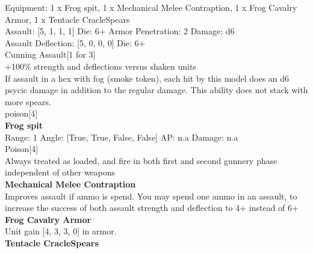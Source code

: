 Equipment: 1 x Frog spit, 1 x Mechanical Melee Contraption, 1 x Frog Cavalry Armor, 1 x Tentacle CracleSpears \\

Assault: [5, 1, 1, 1] Die: 6+ Armor Penetration: 2 Damage: d6 \\
Assault Deflection: [5, 0, 0, 0] Die: 6+\\
\indent Cunning Assault[1 for 3]\\ 
+100\% strength and deflections versus shaken units\\ 
If assault in a hex with fog (smoke token), each hit by this model does an d6 psycic damage in addition to the regular damage. This ability does not stack with more spears.\\ 
poison[4]\\ 
 



{\bf Frog spit } \\



Range: 1  Angle: [True, True, False, False] AP: n.a Damage: n.a \\
Poison[4]\\ 
Always treated as loaded, and fire in both first and second gunnery phase independent of other weapons\\ 




{\bf Mechanical Melee Contraption } \\

Improves assault if ammo is spend. You may spend one ammo in an assault, to increase the success of both assault strength and deflection to 4+ instead of 6+\\ 





{\bf Frog Cavalry Armor } \\

Unit gain [4, 3, 3, 0] in armor.\\ 





{\bf Tentacle CracleSpears } \\






 















